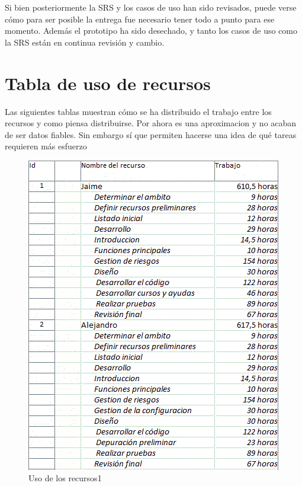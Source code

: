 \documentclass[spanish,a4paper,11pt, twoside]{report}	%
\begin{document}
	 Si bien posteriormente la SRS y los casos de uso han sido revisados, puede verse cómo para ser posible la entrega fue necesario tener todo a punto para ese momento.
	Además el prototipo ha sido desechado, y tanto los casos de uso como la SRS están en continua revisión y cambio.
	

	\newpage

	\section{Tabla de uso de recursos}
	
	Las siguientes tablas muestran cómo se ha distribuido el trabajo entre los recursos y como piensa distribuirse.
	Por ahora es una aproximacion y no acaban de ser datos fiables. Sin embargo sí que permiten hacerse una idea de qué tareas requieren más esfuerzo
	\begin{figure}[!h]
	\centering
	\includegraphics[scale=0.8]{UsoRecursos1.png}
	\caption{Uso de los recursos1}
	\end{figure}
\end{document}
